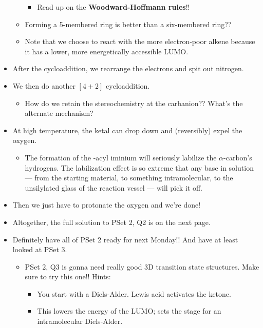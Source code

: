 \documentclass[../notes.tex]{subfiles}
\begin{document}
\begin{itemize}
\begin{itemize}
        \begin{itemize}
            \item Read up on the \textbf{Woodward-Hoffmann rules}!!
        \end{itemize}
        \item Forming a 5-membered ring is better than a six-membered ring??
        \item Note that we choose to react with the more electron-poor alkene because it has a lower, more energetically accessible LUMO.
    \end{itemize}
    \item After the cycloaddition, we rearrange the electrons and spit out nitrogen.
    \item We then do another $[4+2]$ cycloaddition.
    \begin{itemize}
        \item How do we retain the stereochemistry at the carbanion?? What's the alternate mechanism?
    \end{itemize}
    \item At high temperature, the  ketal can drop down and (reversibly) expel the oxygen.
    \begin{itemize}
        \item The formation of the -acyl iminium will seriously labilize the $\alpha$-carbon's hydrogens. The labilization effect is so extreme that any base in solution --- from the starting material, to something intramolecular, to the unsilylated glass of the reaction vessel --- will pick it off.
    \end{itemize}
    \item Then we just have to protonate the oxygen and we're done!
    \item Altogether, the full solution to PSet 2, Q2 is on the next page.
    
    \item Definitely have all of PSet 2 ready for next Monday!! And have at least looked at PSet 3.
    \begin{itemize}
        \item PSet 2, Q3 is gonna need really good 3D transition state structures. Make sure to try this one!! Hints:
        \begin{itemize}
            \item You start with a Diels-Alder. Lewis acid activates the ketone.
            \item This lowers the energy of the LUMO; sets the stage for an intramolecular Diels-Alder.

\end{itemize}
\end{itemize}
\end{itemize}
\end{document}
